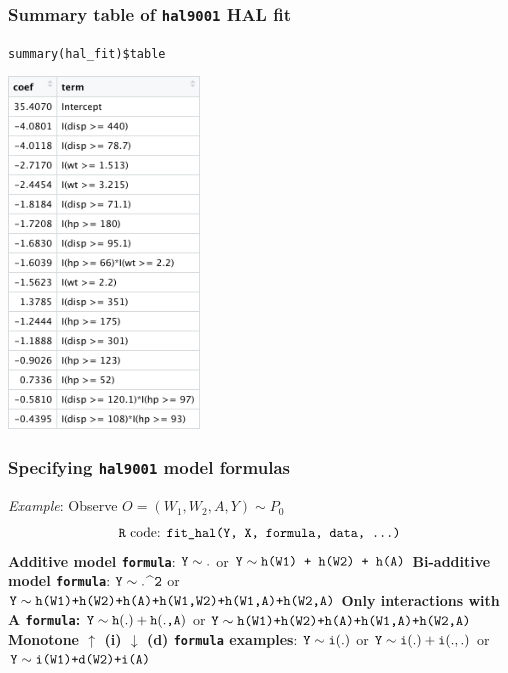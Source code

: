 \documentclass[t]{beamer}
\begin{document}
\begin{frame}
\frametitle{Summary table of \texttt{hal9001}  HAL fit}
\vspace{-2pt}
\texttt{summary(hal\_fit)\$table}
\begin{center}
\vspace{-2pt}
\includegraphics[width = 0.38\textwidth]{figures/HAL-summary-mtcars.png}
\end{center}
\end{frame}

\begin{frame}
\frametitle{Specifying \texttt{hal9001} model formulas}
\textit{Example}: Observe $O=(W_1, W_2, A, Y) \sim P_0$ \newline
$$\text{\texttt{R} code: \texttt{fit\_hal(Y, X, formula, data, ...)}} $$
\textbf{Additive model \texttt{formula}}: \newline
$\text{\texttt{Y}} \sim . $ or $\text{\texttt{Y}} \sim \text{\texttt{h(W1) + h(W2) + h(A)}} $
\vspace{0.05in}
\textbf{Bi-additive model \texttt{formula}}: \newline
$\text{\texttt{Y}} \sim . $\^{}$\text{\texttt{2}}$ or $\text{\texttt{Y}} \sim \text{\texttt{h(W1)+h(W2)+h(A)+h(W1,W2)+h(W1,A)+h(W2,A)}}$
\vspace{0.05in}
\textbf{Only interactions with A \texttt{formula}:} \newline
$\text{\texttt{Y}} \sim \text{\texttt{h}}(.) + \text{\texttt{h}}(.\text{\texttt{,A}})$ or $\text{\texttt{Y}} \sim \text{\texttt{h(W1)+h(W2)+h(A)+h(W1,A)+h(W2,A)}}$
\vspace{0.05in}
\textbf{Monotone $\uparrow$ (i) $\downarrow$ (d) \texttt{formula} examples}:
$\text{\texttt{Y}} \sim \text{\texttt{i}}(.) $ or $\text{\texttt{Y}} \sim \text{\texttt{i}}(.) + \text{\texttt{i}}(.,.) $ or
$\text{\texttt{Y}} \sim \text{\texttt{i(W1)+d(W2)+i(A)}}$
\end{frame}
\end{document}
